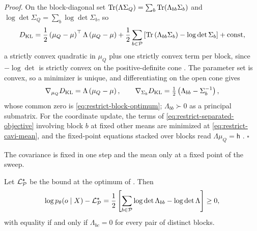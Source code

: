 \noindent\emph{Proof.}
On the block-diagonal set \(\operatorname{Tr}(\Lambda\Sigma_Q)=\sum_b\operatorname{Tr}(\Lambda_{bb}\Sigma_b)\)
and \(\log\det\Sigma_Q=\sum_b\log\det\Sigma_b\), so
\begin{equation}
D_{\mathrm{KL}}=\frac12\left(\mu_Q-\mu\right)^\top\Lambda\left(\mu_Q-\mu\right)
+\frac12\sum_{b\in\mathcal P}\left[\operatorname{Tr}\left(\Lambda_{bb}\Sigma_b\right)-\log\det\Sigma_b\right]
+\text{const},
\label{eq:restrict-separated-objective}
\end{equation}
a strictly convex quadratic in \(\mu_Q\) plus one strictly convex term per block,
since \(-\log\det\) is strictly convex on the positive-definite cone
\citep[\S3.1.5]{Boyd2004}. The parameter set is convex, so a minimizer is
unique, and differentiating on the open cone gives
\begin{equation}
\nabla_{\mu_Q}D_{\mathrm{KL}}=\Lambda\left(\mu_Q-\mu\right),
\qquad
\nabla_{\Sigma_b}D_{\mathrm{KL}}=\tfrac12\left(\Lambda_{bb}-\Sigma_b^{-1}\right),
\label{eq:restrict-derivatives}
\end{equation}
whose common zero is \eqref{eq:restrict-block-optimum}; \(\Lambda_{bb}\succ0\) as
a principal submatrix. For the coordinate update, the terms of
\eqref{eq:restrict-separated-objective} involving block \(b\) at fixed other
means are minimized at \eqref{eq:restrict-cavi-mean}, and the fixed-point
equations stacked over blocks read \(\Lambda\mu_Q=\mathsf h\)
\citep{Bishop2006,Blei2017}. \(\square\)

The covariance is fixed in one step and the mean only at a fixed point of the
sweep.

Let \(\mathcal L^\star_{\mathcal P}\) be the bound at the optimum of
. Then
\begin{equation}
\log p_\theta(o\mid X)-\mathcal L^\star_{\mathcal P}
=\frac12\left[\sum_{b\in\mathcal P}\log\det\Lambda_{bb}-\log\det\Lambda\right]
\geq0,
\label{eq:restrict-determinant-gap}
\end{equation}
with equality if and only if \(\Lambda_{bc}=0\) for every pair of distinct
blocks. 

